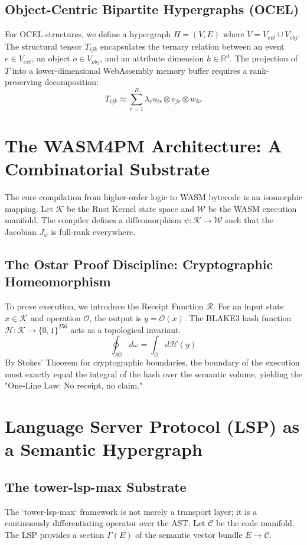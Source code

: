 \documentclass[12pt,a4paper]{book}
\begin{document}
\section{Object-Centric Bipartite Hypergraphs (OCEL)}
For OCEL structures, we define a hypergraph $H = (V, E)$ where $V = V_{evt} \cup V_{obj}$. The structural tensor $T_{ijk}$ encapsulates the ternary relation between an event $e \in V_{evt}$, an object $o \in V_{obj}$, and an attribute dimension $k \in \mathbb{R}^d$. The projection of $T$ into a lower-dimensional WebAssembly memory buffer requires a rank-preserving decomposition:
\[ T_{ijk} \approx \sum_{r=1}^{R} \lambda_r u_{ir} \otimes v_{jr} \otimes w_{kr} \]

\chapter{The WASM4PM Architecture: A Combinatorial Substrate}
The core compilation from higher-order logic to WASM bytecode is an isomorphic mapping. Let $\mathcal{K}$ be the Rust Kernel state space and $\mathcal{W}$ be the WASM execution manifold. The compiler defines a diffeomorphism $\psi: \mathcal{K} \to \mathcal{W}$ such that the Jacobian $J_\psi$ is full-rank everywhere.

\section{The Ostar Proof Discipline: Cryptographic Homeomorphism}
To prove execution, we introduce the Receipt Function $\mathcal{R}$. For an input state $x \in \mathcal{K}$ and operation $\mathcal{O}$, the output is $y = \mathcal{O}(x)$. The BLAKE3 hash function $\mathcal{H}: \mathcal{K} \to \{0,1\}^{256}$ acts as a topological invariant. 
\[ \oint_{\partial \mathcal{O}} d\omega = \int_{\mathcal{O}} d\mathcal{H}(y) \]
By Stokes' Theorem for cryptographic boundaries, the boundary of the execution must exactly equal the integral of the hash over the semantic volume, yielding the "One-Line Law: No receipt, no claim."

\chapter{Language Server Protocol (LSP) as a Semantic Hypergraph}
\section{The tower-lsp-max Substrate}
The `tower-lsp-max` framework is not merely a transport layer; it is a continuously differentiating operator over the AST. Let $\mathcal{C}$ be the code manifold. The LSP provides a section $\Gamma(E)$ of the semantic vector bundle $E \to \mathcal{C}$.
\end{document}
